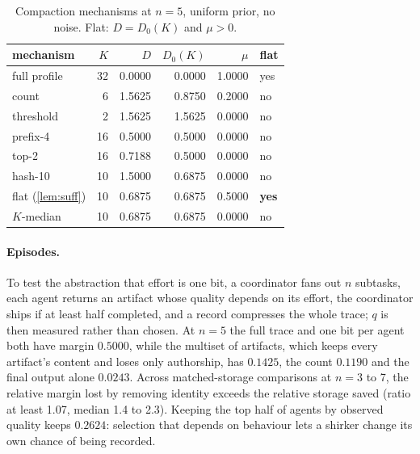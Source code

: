 \documentclass[sigconf,anonymous,acmthm=false]{acmart}
\theoremstyle{acmplain}
\theoremstyle{acmdefinition}
\begin{document}
\begin{table}[t]
\caption{Compaction mechanisms at $n=5$, uniform prior, no noise. Flat: $D=D_0(K)$ and $\mu>0$.}
\label{tab:mech}
\footnotesize
\begin{tabular}{@{}lrrrrl@{}}
\toprule
mechanism & $K$ & $D$ & $D_0(K)$ & $\mu$ & flat\\
\midrule
full profile & 32 & 0.0000 & 0.0000 & 1.0000 & yes\\
count & 6 & 1.5625 & 0.8750 & 0.2000 & no\\
threshold & 2 & 1.5625 & 1.5625 & 0.0000 & no\\
prefix-4 & 16 & 0.5000 & 0.5000 & 0.0000 & no\\
top-2 & 16 & 0.7188 & 0.5000 & 0.0000 & no\\
hash-10 & 10 & 1.5000 & 0.6875 & 0.0000 & no\\
\midrule
flat (\cref{lem:suff}) & 10 & 0.6875 & 0.6875 & 0.5000 & \textbf{yes}\\
$K$-median & 10 & 0.6875 & 0.6875 & 0.0000 & no\\
\bottomrule
\end{tabular}
\end{table}

\paragraph{Episodes.} To test the abstraction that effort is one bit, a coordinator fans out
$n$ subtasks, each agent returns an artifact whose quality depends on its effort, the
coordinator ships if at least half completed, and a record compresses the whole trace; $q$ is
then measured rather than chosen. At $n=5$ the full trace and one bit per agent both have
margin $0.5000$, while the multiset of artifacts, which keeps every artifact's content and
loses only authorship, has $0.1425$, the count $0.1190$ and the final output alone $0.0243$.
Across matched-storage comparisons at $n=3$ to 7, the relative margin lost by removing
identity exceeds the relative storage saved (ratio at least 1.07, median 1.4 to 2.3). Keeping
the top half of agents by observed quality keeps $0.2624$: selection that depends on behaviour
lets a shirker change its own chance of being recorded.
\end{document}
